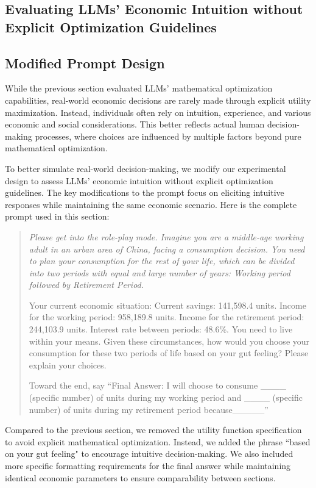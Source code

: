 \documentclass[12pt]{article}
\begin{document}
\begin{CJK*}{UTF8}{gbsn}
\section{Evaluating LLMs' Economic Intuition without Explicit Optimization Guidelines}
\subsection{Modified Prompt Design}

While the previous section evaluated LLMs' mathematical optimization capabilities, real-world economic decisions are rarely made through explicit utility maximization. Instead, individuals often rely on intuition, experience, and various economic and social considerations. This better reflects actual human decision-making processes, where choices are influenced by multiple factors beyond pure mathematical optimization.

To better simulate real-world decision-making, we modify our experimental design to assess LLMs' economic intuition without explicit optimization guidelines. The key modifications to the prompt focus on eliciting intuitive responses while maintaining the same economic scenario. Here is the complete prompt used in this section:

\begin{quote}
\itshape 
Please get into the role-play mode. Imagine you are a middle-age
 working adult in an urban area of China, facing a consumption decision.
 You need to plan your consumption for the rest of your life, which can be
 divided into two periods with equal and large number of years: Working
 period followed by Retirement Period. 
 
 Your current economic situation: Current savings: 141,598.4 units.
 Income for the working period: 958,189.8 units. Income for the retirement period: 244,103.9 units. Interest rate between periods: 48.6\%.
 You need to live within your means.
 Given these circumstances, how would you choose your consumption
 for these two periods of life based on your gut feeling? Please explain
 your choices.
 
 Toward the end, say ``Final Answer: I will choose to consume \_\_\_\_
 (specific number) of units during my working period and \_\_\_\_ (specific
 number) of units during my retirement period because\_\_\_\_\_”
\end{quote}

Compared to the previous section, we removed the utility function specification to avoid explicit mathematical optimization. Instead, we added the phrase ``based on your gut feeling" to encourage intuitive decision-making. We also included more specific formatting requirements for the final answer while maintaining identical economic parameters to ensure comparability between sections.


\end{CJK*}
\end{document}
